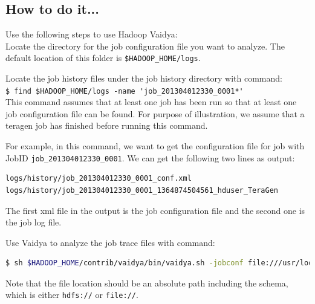 \subsection*{How to do it...}
Use the following steps to use Hadoop Vaidya: \\
Locate the directory for the job configuration file you want to analyze. The default location of this folder is \verb|$HADOOP_HOME/logs|.

Locate the job history files under the job history directory with command:\\
\verb|$ find $HADOOP_HOME/logs -name 'job_201304012330_0001*'| \\

This command assumes that at least one job has been run so that at least one job configuration file can be found. For purpose of illustration, we assume that a teragen job has finished before running this command.

For example, in this command, we want to get the configuration file for job with JobID \verb|job_201304012330_0001|. We can get the following two lines as output:
\lstset{style=bashstyle}
\begin{lstlisting}
logs/history/job_201304012330_0001_conf.xml
logs/history/job_201304012330_0001_1364874504561_hduser_TeraGen
\end{lstlisting}
The first xml file in the output is the job configuration file and the second one is the job log file.

Use Vaidya to analyze the job trace files with command:
\lstset{style=bashstyle}
\begin{lstlisting}[language=bash]
$ sh $HADOOP_HOME/contrib/vaidya/bin/vaidya.sh -jobconf file:///usr/local/hadoop/logs/history/job_201304012330_0002_conf.xml -joblog file:///usr/local/hadoop/logs/history/job_201304012330_0002_1364874504561_hduser_TeraGen -report report.txt
\end{lstlisting}

\begin{info}
Note that the file location should be an absolute path including the schema, which is either \verb|hdfs://| or \verb|file://|.
\end{info}

